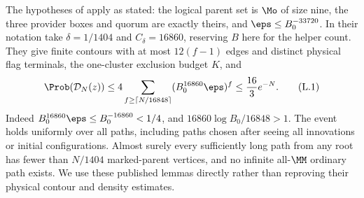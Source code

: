 The hypotheses of \cite[Lemmas~12.3 and 12.4]{DMforgetLower} apply as stated: the logical parent set is $\Mo$ of size nine, the three provider boxes and quorum are exactly theirs, and $\eps\le B_0^{-33720}$. In their notation take $\delta=1/1404$ and $C_\delta=16860$, reserving $B$ here for the helper count. They give finite contours with at most $12(f-1)$ edges and distinct physical flag terminals, the one-cluster exclusion budget $K$, and
\[
 \Prob(\mathcal D_N(z))\le
 4\sum_{f\ge\lceil N/16848\rceil}(B_0^{16860}\eps)^f
 \le\frac{16}{3}e^{-N}.                                      \tag{L.1}\label{eq:lower-density}
\]
Indeed $B_0^{16860}\eps\le B_0^{-16860}<1/4$, and
$16860\log B_0/16848>1$. The event holds uniformly over all paths, including paths chosen after seeing all innovations or initial configurations. Almost surely every sufficiently long path from any root has fewer than $N/1404$ marked-parent vertices, and no infinite all-$\MM$ ordinary path exists. We use these published lemmas directly rather than reproving their physical contour and density estimates.

